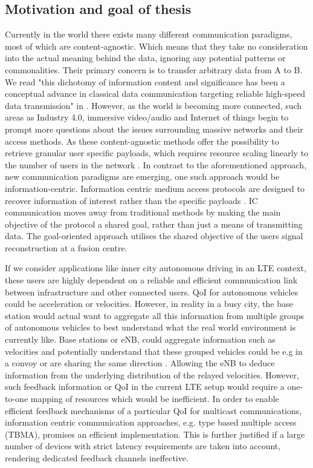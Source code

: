 \documentclass{article}
\begin{document}
\subsection{Motivation and goal of thesis}
Currently in the world there exists many different communication paradigms, most of which are content-agnostic. Which means that they take no consideration into the actual meaning behind the data, ignoring any potential patterns or commonalities. Their primary concern is to transfer arbitrary data from A to B. We read "this dichotomy of information content and significance has been a conceptual advance in classical data communication targeting reliable high-speed data transmission" in \cite{kountouris}. 
However, as the world is becoming more connected, such areas as Industry 4.0, immersive video/audio and Internet of things begin to prompt more questions about the issues surrounding massive networks and their access methods. As these content-agnostic methods offer the possibility to retrieve granular user specific payloads, which requires resource scaling linearly to the number of users in the network \cite{aloha,graphbased_analysis,coded_ran,capacity_gauss}. In contrast to the aforementioned approach, new communication paradigms are emerging, one such approach would be information-centric. Information centric  medium access protocols are designed to recover information of interest rather than the specific payloads \cite{kountouris,sem_coms,sem_filter,source_chane_coding,source_chane_coding2}. \ac{IC} communication moves away from traditional methods by making the main objective of the protocol a shared goal, rather than just a means of transmitting data. The goal-oriented approach utilises the shared objective of the users signal reconstruction at a fusion centre. 

If we consider applications like inner city autonomous driving in an LTE context, these users are highly dependent on a reliable and efficient communication link between infrastructure and other connected users. \ac{QoI} for autonomous vehicles could be acceleration or velocities. However, in reality in a busy city, the base station would actual want to aggregate all this information from multiple groups of autonomous vehicles to best understand what the real world environment is currently like. Base stations or \ac{eNB}, could aggregate information such as velocities and potentially understand that these grouped vehicles could be e.g in a convoy or are sharing the same direction . Allowing the \ac{eNB} to deduce information from the underlying distribution of the relayed velocities. However, such feedback information or \ac{QoI} in the current \ac{LTE} setup would require a one-to-one mapping of resources which would be inefficient. In order to enable efficient feedback mechanisms of a particular \ac{QoI} for multicast communications, information centric communication approaches, e.g. type based multiple access (TBMA)\cite{tbma}, promises an efficient implementation. This is further justified if a large number of devices with strict latency requirements are taken into account, rendering dedicated feedback channels ineffective. 
\end{document}
